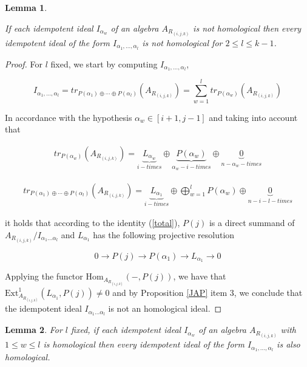 \documentclass[10pt,twoside]{article}
\newcounter{neq}
\newtheorem{lema}{Lemma}
\theoremstyle{definition}
\begin{document}
\begin{lema}\label{center2}

If each idempotent ideal $I_{\alpha_w}$  of an algebra $A_{R_{(i, j, k)}}$ is not homological then every idempotent ideal of the form $I_{\alpha_1,\ldots,\alpha_l}$ is not homological for $2\leq l\leq k-1$.    
\end{lema}

\begin{proof}
For $l$ fixed, we start by computing $I_{\alpha_1,\ldots,\alpha_l}$,  

\[I_{\alpha_1,\ldots,\alpha_l}=tr_{P(\alpha_1)\oplus \cdots \oplus P(\alpha_l)}(A_{R_{(i, j, k)}})= \displaystyle \sum_{w=1}^{l}tr_{P(\alpha_w)}(A_{R_{(i, j, k)}}) \]

In accordance with the hypothesis $\alpha_w \in [i+1,j-1]$ and taking into account that


\begin{equation}\label{middle}
\begin{split}
tr_{P(\alpha_w)}(A_{R_{(i, j, k)}})=\underbrace{L_{\alpha_w}}_{i- times} \oplus  \underbrace{ P(\alpha_w)}_{\alpha_w-i-times} \oplus\underbrace{0}_{n-\alpha_w-times}
\end{split}
\end{equation}


\begin{equation}\label{total}
\begin{split}
tr_{P(\alpha_1)\oplus \cdots \oplus P(\alpha_l)}(A_{R_{(i, j, k)}})=\underbrace{L_{\alpha_1}}_{i- times}\oplus  \bigoplus_{w=1}^{l} P(\alpha_w) \oplus\underbrace{0}_{n-i-l-times}
\end{split}
\end{equation}

it holds that according to the identity (\ref{total}), $P(j)$ is a direct summand of  $A_{R_{(i, j, k)}}/I_{\alpha_1\ldots\alpha_l}$ and $L_{\alpha_1}$ has the following projective resolution


\[
0 \to P(j) \to P(\alpha_1) \to L_{\alpha_1} \to 0
\]


Applying the functor $ \textrm{Hom}_{A_{R_{(i, j, k)}}}(-,P(j))$,  we have that $\textrm{Ext}^{1}_{A_{R_{(i, j, k)}}}(L_{\alpha_1},P(j))\neq 0$ and by Proposition \ref{JAP} item 3, we conclude that the idempotent ideal $I_{\alpha_1\ldots\alpha_l}$ is not an homological ideal.
\end{proof}





\begin{lema}\label{17}
For $l$ fixed, if each idempotent ideal $I_{\alpha_w}$  of an algebra $A_{R_{(i, j, k)}}$ with $1 \leq w \leq l$ is homological then every idempotent ideal of the form $I_{\alpha_1,\ldots,\alpha_l}$ is also homological.  
\end{lema}
\end{document}
